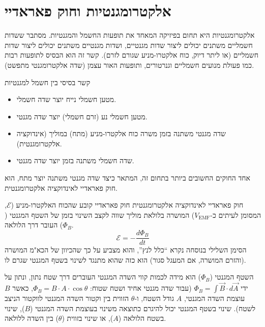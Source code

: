 \documentclass[12pt]{article}
\newcommand{\enquote}[1]{\textquotedblleft #1\textquotedblright}
\begin{document}
\section{אלקטרומגנטיות וחוק פאראדיי}

אלקטרומגנטיות היא תחום בפיזיקה המאחד את תופעות החשמל והמגנטיות. מסתבר ששדות חשמליים משתנים יכולים ליצור שדות מגנטיים, ושדות מגנטיים משתנים יכולים ליצור שדות חשמליים (או ליתר דיוק, כוח אלקטרו-מניע שגורם לזרם). קשר זה הוא הבסיס לתופעות רבות כמו פעולת מנועים חשמליים וגנרטורים, ותופעות האור עצמן (שדה אלקטרומגנטי מתפשט).

\begin{remarkBox}{קשר בסיסי בין חשמל למגנטיות}
\begin{itemize}
    \item מטען חשמלי נייח יוצר שדה חשמלי.
    \item מטען חשמלי נע (זרם חשמלי) יוצר שדה מגנטי.
    \item שדה מגנטי משתנה בזמן משרה כוח אלקטרו-מניע (מתח) במוליך (אינדוקציה אלקטרומגנטית).
    \item שדה חשמלי משתנה בזמן יוצר שדה מגנטי.
\end{itemize}
\end{remarkBox}

אחד החוקים החשובים ביותר בתחום זה, המתאר כיצד שדה מגנטי משתנה יוצר מתח, הוא חוק פאראדיי לאינדוקציה אלקטרומגנטית.

\begin{lawBox}{חוק פאראדיי לאינדוקציה אלקטרומגנטית}
חוק פאראדיי קובע שהכוח האלקטרו-מניע (\(\mathcal{E}\), המסומן לעיתים כ-\(V_{\text{EMF}}\)) המושרה בלולאת מוליך שווה לקצב השינוי בזמן של השטף המגנטי (\(\Phi_B\)) העובר דרך הלולאה.
\begin{equation*}
\mathcal{E} = - \frac{d\Phi_B}{dt}
\end{equation*}
הסימן השלילי בנוסחה נקרא \enquote{כלל לנץ}, והוא מצביע על כך שהכיוון של הכא"מ המושרה (והזרם המושרה, אם המעגל סגור) הוא כזה שהוא מתנגד לשינוי בשטף המגנטי שגרם לו.

השטף המגנטי (\(\Phi_B\)) הוא מידה לכמות קווי השדה המגנטי העוברים דרך שטח נתון, ונתון על ידי \(\Phi_B = \int \vec{B} \cdot d\vec{A}\) (עבור שדה מגנטי אחיד ושטח שטוח: \(\Phi_B = B \cdot A \cdot \cos\theta\), כאשר \(B\) עוצמת השדה המגנטי, \(A\) גודל השטח, ו-\(\theta\) הזווית בין וקטור השדה המגנטי לווקטור הניצב לשטח).
שינוי בשטף המגנטי יכול להיגרם כתוצאה משינוי בעוצמת השדה המגנטי (\(B\)), שינוי בשטח הלולאה (\(A\)), או שינוי בזווית (\(\theta\)) בין השדה ללולאה.
\end{lawBox}
\end{document}
